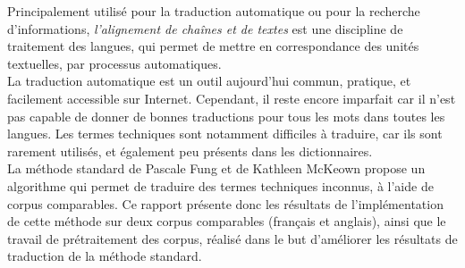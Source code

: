 
Principalement utilisé pour la traduction automatique ou pour la recherche d'informations, \textit{l'alignement de chaînes et de textes} est une discipline de traitement des langues, qui permet de mettre en correspondance des unités textuelles, par processus automatiques.\\

La traduction automatique est un outil aujourd'hui commun, pratique, et facilement accessible sur Internet. Cependant, il reste encore imparfait car il n’est pas capable de donner de bonnes traductions pour tous les mots dans toutes les langues. Les termes techniques sont notamment difficiles à traduire, car ils sont rarement utilisés, et également peu présents dans les dictionnaires.\\

La méthode standard de Pascale Fung et de Kathleen McKeown\cite{Fung97findingterminology} propose un algorithme qui permet de traduire des termes techniques inconnus, à l'aide de corpus comparables. Ce rapport présente donc les résultats de l'implémentation de cette méthode sur deux corpus comparables (français et anglais), ainsi que le travail de prétraitement des corpus, réalisé dans le but d'améliorer les résultats de traduction de la méthode standard.

